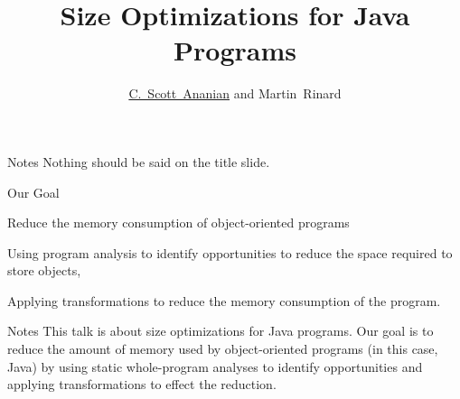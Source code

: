 \documentclass[%
pdf,
colorBG,
slideColor,
nototal,
oqe
]{prosper}
\title{Size Optimizations for Java Programs}
\author{\large\href{http://cscott.net}{C.~Scott~Ananian} and Martin~Rinard}
\newenvironment{talknotes}{\begin{slide}{Notes}\tiny}{\end{slide}}
\begin{document}
\maketitle

\begin{talknotes}
Nothing should be said on the title slide.
\end{talknotes}


\begin{slide}{Our Goal}
\begin{center}
Reduce the memory consumption of object-oriented programs

\vspace{0.5cm}
\vspace{0.5cm}

Using program analysis to identify opportunities to reduce the space
required to store objects,

\vspace{0.5cm}
\vspace{0.5cm}

Applying transformations to reduce the memory consumption of the program.
\end{center}
\end{slide}

\begin{talknotes}
This talk is about size optimizations for Java programs.  Our goal is
to reduce the amount of memory used by object-oriented programs (in
this case, Java) by using static whole-program analyses to identify
opportunities and applying transformations to effect the reduction.
\end{talknotes}
\end{document}

